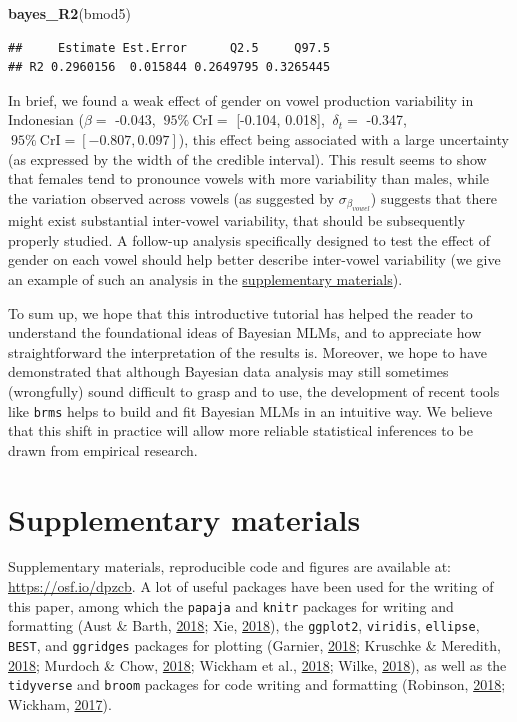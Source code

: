 \documentclass[a4paper,12pt,twoside,onecolumn,openright,final,oldfontcommands]{memoir}
\newenvironment{Shaded}{}{}
\newcommand{\KeywordTok}[1]{\textcolor[rgb]{0.00,0.44,0.13}{\textbf{#1}}}
\newcommand{\NormalTok}[1]{#1}
\begin{document}
\begin{Shaded}
\begin{Highlighting}[]
\KeywordTok{bayes_R2}\NormalTok{(bmod5)}
\end{Highlighting}
\end{Shaded}

\begin{verbatim}
##     Estimate Est.Error      Q2.5     Q97.5
## R2 0.2960156  0.015844 0.2649795 0.3265445
\end{verbatim}

In brief, we found a weak effect of gender on vowel production variability in Indonesian (\(\beta =\) -0.043, \(\ 95 \% \ \text{CrI} =\) {[}-0.104, 0.018{]}, \(\ \delta_{t} =\) -0.347, \(\ 95 \% \ \text{CrI} = [-0.807, 0.097]\)), this effect being associated with a large uncertainty (as expressed by the width of the credible interval). This result seems to show that females tend to pronounce vowels with more variability than males, while the variation observed across vowels (as suggested by \(\sigma_{\beta_{vowel}}\)) suggests that there might exist substantial inter-vowel variability, that should be subsequently properly studied. A follow-up analysis specifically designed to test the effect of gender on each vowel should help better describe inter-vowel variability (we give an example of such an analysis in the \protect\hyperlink{suppApp}{supplementary materials}).

To sum up, we hope that this introductive tutorial has helped the reader to understand the foundational ideas of Bayesian MLMs, and to appreciate how straightforward the interpretation of the results is. Moreover, we hope to have demonstrated that although Bayesian data analysis may still sometimes (wrongfully) sound difficult to grasp and to use, the development of recent tools like \texttt{brms} helps to build and fit Bayesian MLMs in an intuitive way. We believe that this shift in practice will allow more reliable statistical inferences to be drawn from empirical research.

\hypertarget{suppApp}{%
\section{Supplementary materials}\label{suppApp}}

Supplementary materials, reproducible code and figures are available at: \url{https://osf.io/dpzcb}. A lot of useful packages have been used for the writing of this paper, among which the \texttt{papaja} and \texttt{knitr} packages for writing and formatting (Aust \& Barth, \protect\hyperlink{ref-R-papaja}{2018}; Xie, \protect\hyperlink{ref-R-knitr}{2018}), the \texttt{ggplot2}, \texttt{viridis}, \texttt{ellipse}, \texttt{BEST}, and \texttt{ggridges} packages for plotting (Garnier, \protect\hyperlink{ref-R-viridis}{2018}; Kruschke \& Meredith, \protect\hyperlink{ref-R-BEST}{2018}; Murdoch \& Chow, \protect\hyperlink{ref-R-ellipse}{2018}; Wickham et al., \protect\hyperlink{ref-R-ggplot2}{2018}; Wilke, \protect\hyperlink{ref-R-ggridges}{2018}), as well as the \texttt{tidyverse} and \texttt{broom} packages for code writing and formatting (Robinson, \protect\hyperlink{ref-R-broom}{2018}; Wickham, \protect\hyperlink{ref-R-tidyverse}{2017}).
\end{document}
